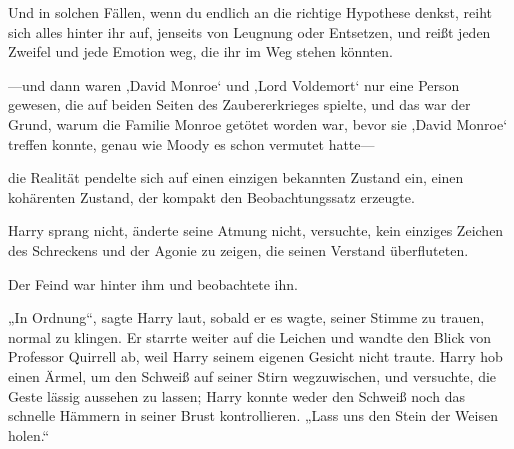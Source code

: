 Und in solchen Fällen, wenn du endlich an die richtige Hypothese denkst, reiht sich alles hinter ihr auf, jenseits von Leugnung oder Entsetzen, und reißt jeden Zweifel und jede Emotion weg, die ihr im Weg stehen könnten.

—und dann waren ‚David Monroe‘ und ‚Lord Voldemort‘ nur eine Person gewesen, die auf beiden Seiten des Zaubererkrieges spielte, und das war der Grund, warum die Familie Monroe getötet worden war, bevor sie ‚David Monroe‘ treffen konnte, genau wie Moody es schon vermutet hatte—

die Realität pendelte sich auf einen einzigen bekannten Zustand ein, einen kohärenten Zustand, der kompakt den Beobachtungssatz erzeugte.

Harry sprang nicht, änderte seine Atmung nicht, versuchte, kein einziges Zeichen des Schreckens und der Agonie zu zeigen, die seinen Verstand überfluteten.

Der Feind war hinter ihm und beobachtete ihn.

„In Ordnung“, sagte Harry laut, sobald er es wagte, seiner Stimme zu trauen, normal zu klingen. Er starrte weiter auf die Leichen und wandte den Blick von Professor Quirrell ab, weil Harry seinem eigenen Gesicht nicht traute. Harry hob einen Ärmel, um den Schweiß auf seiner Stirn wegzuwischen, und versuchte, die Geste lässig aussehen zu lassen; Harry konnte weder den Schweiß noch das schnelle Hämmern in seiner Brust kontrollieren.
„Lass uns den Stein der Weisen holen.“

